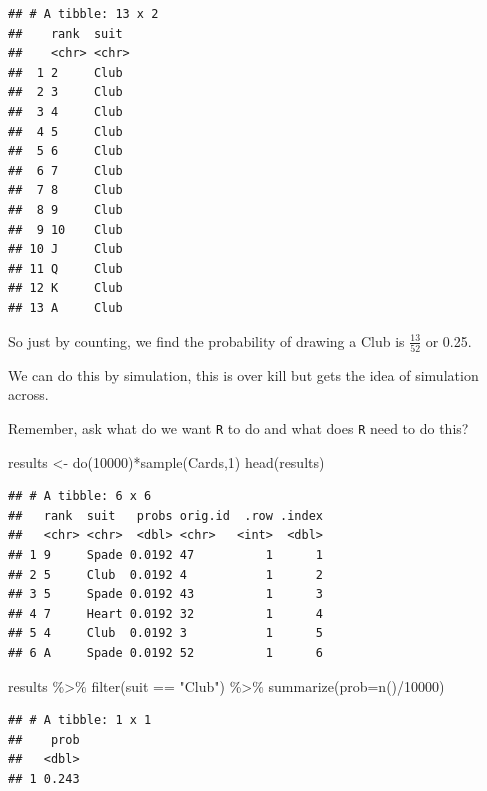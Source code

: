 \documentclass[
]{book}
\newenvironment{Shaded}{\begin{snugshade}}{\end{snugshade}}
\newcommand{\AttributeTok}[1]{\textcolor[rgb]{0.77,0.63,0.00}{#1}}
\newcommand{\DecValTok}[1]{\textcolor[rgb]{0.00,0.00,0.81}{#1}}
\newcommand{\FunctionTok}[1]{\textcolor[rgb]{0.00,0.00,0.00}{#1}}
\newcommand{\NormalTok}[1]{#1}
\newcommand{\OtherTok}[1]{\textcolor[rgb]{0.56,0.35,0.01}{#1}}
\newcommand{\SpecialCharTok}[1]{\textcolor[rgb]{0.00,0.00,0.00}{#1}}
\newcommand{\StringTok}[1]{\textcolor[rgb]{0.31,0.60,0.02}{#1}}
\begin{document}
\begin{verbatim}
## # A tibble: 13 x 2
##    rank  suit 
##    <chr> <chr>
##  1 2     Club 
##  2 3     Club 
##  3 4     Club 
##  4 5     Club 
##  5 6     Club 
##  6 7     Club 
##  7 8     Club 
##  8 9     Club 
##  9 10    Club 
## 10 J     Club 
## 11 Q     Club 
## 12 K     Club 
## 13 A     Club
\end{verbatim}

So just by counting, we find the probability of drawing a Club is \(\frac{13}{52}\) or 0.25.

We can do this by simulation, this is over kill but gets the idea of simulation across.

Remember, ask what do we want \texttt{R} to do and what does \texttt{R} need to do this?

\begin{Shaded}
\begin{Highlighting}[]
\NormalTok{results }\OtherTok{\textless{}{-}} \FunctionTok{do}\NormalTok{(}\DecValTok{10000}\NormalTok{)}\SpecialCharTok{*}\FunctionTok{sample}\NormalTok{(Cards,}\DecValTok{1}\NormalTok{)}
\FunctionTok{head}\NormalTok{(results)}
\end{Highlighting}
\end{Shaded}

\begin{verbatim}
## # A tibble: 6 x 6
##   rank  suit   probs orig.id  .row .index
##   <chr> <chr>  <dbl> <chr>   <int>  <dbl>
## 1 9     Spade 0.0192 47          1      1
## 2 5     Club  0.0192 4           1      2
## 3 5     Spade 0.0192 43          1      3
## 4 7     Heart 0.0192 32          1      4
## 5 4     Club  0.0192 3           1      5
## 6 A     Spade 0.0192 52          1      6
\end{verbatim}

\begin{Shaded}
\begin{Highlighting}[]
\NormalTok{results }\SpecialCharTok{\%\textgreater{}\%}
  \FunctionTok{filter}\NormalTok{(suit }\SpecialCharTok{==} \StringTok{"Club"}\NormalTok{) }\SpecialCharTok{\%\textgreater{}\%}
  \FunctionTok{summarize}\NormalTok{(}\AttributeTok{prob=}\FunctionTok{n}\NormalTok{()}\SpecialCharTok{/}\DecValTok{10000}\NormalTok{)}
\end{Highlighting}
\end{Shaded}

\begin{verbatim}
## # A tibble: 1 x 1
##    prob
##   <dbl>
## 1 0.243
\end{verbatim}
\end{document}
